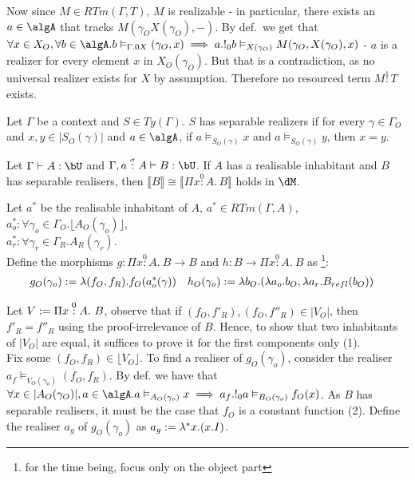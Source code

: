 \documentclass[12pt,a4paper]{article}
\def\rfl{_{refl}}
\renewcommand{\O}{_{O}}\alwaysmath{O}
\newcommand{\R}{\ensuremath{_{R}}}
\begin{document}
Now since $M \in RTm(\Gamma, T)$, $M$ is realizable - in particular, there exists an $a \in \algA$ that tracks $M(\gamma\O X(\gamma\O), -)$. By def.\ we get that $\forall x \in X\O, \forall b \in \algA. b \vDash_{\Gamma.0 X} (\gamma\O, x) \implies a . !_0 b \vDash_{X(\gamma\O)} M(\gamma\O, X(\gamma\O), x)$ - $a$ is a realizer for every element $x$ in $X\O(\gamma\O)$. But that is a contradiction, as no universal realizer exists for $X$ by assumption. Therefore no resourced term $M \overset{1}{:} T$ exists.


\begin{definition}
  Let $\Gamma$ be a context and $S \in Ty(\Gamma)$. $S$ has separable realizers if for every $\gamma \in \Gamma\O$ and $x, y  \in |S\O(\gamma)|$ and $a \in \algA$, if $a \vDash_{S\O(\gamma)} x$ and $a \vDash_{S\O(\gamma)} y$, then $x = y$.
\end{definition}

\begin{thm}
    Let $\Gamma \vdash A : \bU$ and $\Gamma, a \overset{\sigma}{:} A \vdash B : \bU$. If $A$ has a realisable inhabitant and $B$ has separable realisers, then $ \llbracket B \rrbracket \cong \llbracket \Pi x \overset{0}:A.\, B \rrbracket$ holds in $\dM$.
\end{thm}
Let $a^*$ be the realisable inhabitant of $A$, $a^* \in RTm(\Gamma, A)$, $a^*_o : \forall \gamma_o \in \Gamma\O.\lfloor A\O(\gamma_o) \rfloor$,\\ $a^*_r : \forall \gamma_r \in \Gamma\R . A\R(\gamma_r)$. \\
Define the morphisms $g : \Pi x \overset{0}:A.\ B \to B$ and $h : B \to \Pi x \overset{0}:A.\ B$ as \footnote{for the time being, focus only on the object part}:
\begin{align*}
{g\O}(\gamma_o) &\define \lambda (f\O, f\R). f\O(a^*_o(\gamma)) && {h\O}(\gamma_o) \define \lambda b\O. (\lambda a_o. b\O, \lambda a_r. B\rfl(b\O))
\end{align*}

Let $V \define \Pi x \overset{0}:A.\ B$, observe that if $(f\O, f'\R), (f\O, f''\R) \in |V\O|$, then $f'\R = f''\R$ using the proof-irrelevance of $B$. Hence, to show that two inhabitants of $|V\O|$ are equal, it suffices to prove it for the first components only (1).\\

Fix some $(f\O, f\R) \in \lfloor V\O \rfloor$. To find a realiser of $g\O(\gamma_o)$, consider the realiser $a_f \vDash_{V\O(\gamma_o)} (f\O, f\R)$. By def. we have that $\forall x \in |A\O(\gamma_O)|, a \in \algA . a \vDash_{A\O(\gamma_o)} x \implies a_f . !_0 a \vDash_{B\O(\gamma_o)} f\O(x)$. As $B$ has separable realisers, it must be the case that $f\O$ is a constant function (2). Define the realiser $a_g$ of $g\O(\gamma_o)$ as $a_g := \lambda^* x. (x . I)$.
\end{document}
